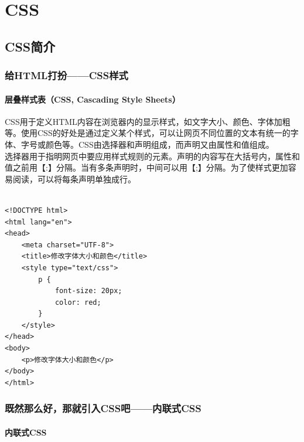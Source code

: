\part{CSS}

\newpage

\chapter{CSS简介}

\section{给HTML打扮——CSS样式}

\subsection{层叠样式表（CSS, Cascading Style Sheets）}

CSS用于定义HTML内容在浏览器内的显示样式，如文字大小、颜色、字体加粗等。使用CSS的好处是通过定义某个样式，可以让网页不同位置的文本有统一的字体、字号或颜色等。CSS由选择器和声明组成，而声明又由属性和值组成。 \\

选择器用于指明网页中要应用样式规则的元素。声明的内容写在大括号内，属性和值之前用【:】分隔。当有多条声明时，中间可以用【;】分隔。为了使样式更加容易阅读，可以将每条声明单独成行。 \\

 \\

\begin{lstlisting}[style=htmlcssjs]
<!DOCTYPE html>
<html lang="en">
<head>
    <meta charset="UTF-8">
    <title>修改字体大小和颜色</title>
    <style type="text/css">
        p {
            font-size: 20px;
            color: red;
        }
    </style>
</head>
<body>
    <p>修改字体大小和颜色</p>
</body>
</html>
\end{lstlisting}

\newpage

\section{既然那么好，那就引入CSS吧——内联式CSS}

\subsection{内联式CSS}

